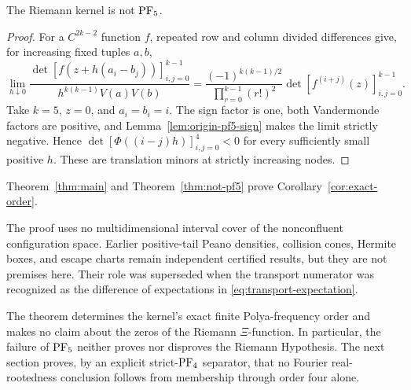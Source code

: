 \begin{theorem}\label{thm:not-pf5}
The Riemann kernel is not \(\mathrm{PF}_5\).
\end{theorem}

\begin{proof}
For a \(C^{2k-2}\) function \(f\), repeated row and column divided differences
give, for increasing fixed tuples \(a,b\),
\[
 \lim_{h\downarrow0}
 \frac{\det[f(z+h(a_i-b_j))]_{i,j=0}^{k-1}}
 {h^{k(k-1)}V(a)V(b)}
 =\frac{(-1)^{k(k-1)/2}}
 {\prod_{r=0}^{k-1}(r!)^2}
 \det[f^{(i+j)}(z)]_{i,j=0}^{k-1}.
\]
Take \(k=5\), \(z=0\), and \(a_i=b_i=i\). The sign factor is one, both
Vandermonde factors are positive, and Lemma~\ref{lem:origin-pf5-sign} makes
the limit strictly negative. Hence
\(\det[\Phi((i-j)h)]_{i,j=0}^4<0\) for every sufficiently small positive
\(h\). These are translation minors at strictly increasing nodes.
\end{proof}

Theorem~\ref{thm:main} and Theorem~\ref{thm:not-pf5} prove
Corollary~\ref{cor:exact-order}.

The proof uses no multidimensional interval cover of the nonconfluent
configuration space. Earlier positive-tail Peano densities, collision cones,
Hermite boxes, and escape charts remain independent certified results, but
they are not premises here. Their role was superseded when the transport
numerator was recognized as the difference of expectations in
\eqref{eq:transport-expectation}.

\begin{remark}
The theorem determines the kernel's exact finite Polya-frequency order and
makes no claim about the zeros of the Riemann \(\Xi\)-function. In particular,
the failure of \(\mathrm{PF}_5\) neither proves nor disproves the Riemann Hypothesis.
The next section proves, by an explicit strict-\(\mathrm{PF}_4\) separator, that no
Fourier real-rootedness conclusion follows from membership through order four
alone.
\end{remark}
